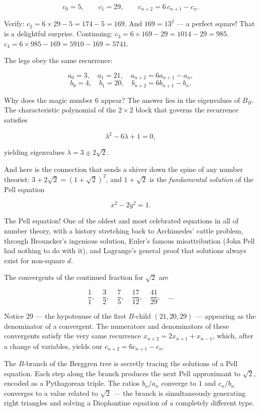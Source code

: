 \[c_0 = 5, \qquad c_1 = 29, \qquad c_{n+2} = 6\,c_{n+1} - c_n.\]

Verify: $c_2 = 6 \times 29 - 5 = 174 - 5 = 169$. And $169 = 13^2$ --- a perfect square! That is a delightful surprise. Continuing: $c_3 = 6 \times 169 - 29 = 1014 - 29 = 985$. $c_4 = 6 \times 985 - 169 = 5910 - 169 = 5741$.

The legs obey the same recurrence:

\[a_0 = 3,\quad a_1 = 21,\quad a_{n+2} = 6a_{n+1} - a_n,\]
\[b_0 = 4,\quad b_1 = 20,\quad b_{n+2} = 6b_{n+1} - b_n.\]

Why does the magic number $6$ appear? The answer lies in the eigenvalues of $B_B$. The characteristic polynomial of the $2 \times 2$ block that governs the recurrence satisfies

\[\lambda^2 - 6\lambda + 1 = 0,\]

yielding eigenvalues $\lambda = 3 \pm 2\sqrt{2}$.

And here is the connection that sends a shiver down the spine of any number theorist: $3 + 2\sqrt{2} = (1 + \sqrt{2})^2$, and $1 + \sqrt{2}$ is the \textit{fundamental solution} of the Pell equation

\[x^2 - 2y^2 = 1.\]

The Pell equation! One of the oldest and most celebrated equations in all of number theory, with a history stretching back to Archimedes' cattle problem, through Brouncker's ingenious solution, Euler's famous misattribution (John Pell had nothing to do with it), and Lagrange's general proof that solutions always exist for non-square $d$.

The convergents of the continued fraction for $\sqrt{2}$ are

\[\frac{1}{1}, \quad \frac{3}{2}, \quad \frac{7}{5}, \quad \frac{17}{12}, \quad \frac{41}{29}, \quad \ldots\]

Notice $29$ --- the hypotenuse of the first $B$-child $(21, 20, 29)$ --- appearing as the denominator of a convergent. The numerators and denominators of these convergents satisfy the very same recurrence $x_{n+2} = 2x_{n+1} + x_{n-1}$, which, after a change of variables, yields our $c_{n+2} = 6c_{n+1} - c_n$.

The $B$-branch of the Berggren tree is secretly tracing the solutions of a Pell equation. Each step along the branch produces the next Pell approximant to $\sqrt{2}$, encoded as a Pythagorean triple. The ratios $b_n / a_n$ converge to $1$ and $c_n / b_n$ converges to a value related to $\sqrt{2}$ --- the branch is simultaneously generating right triangles and solving a Diophantine equation of a completely different type.





